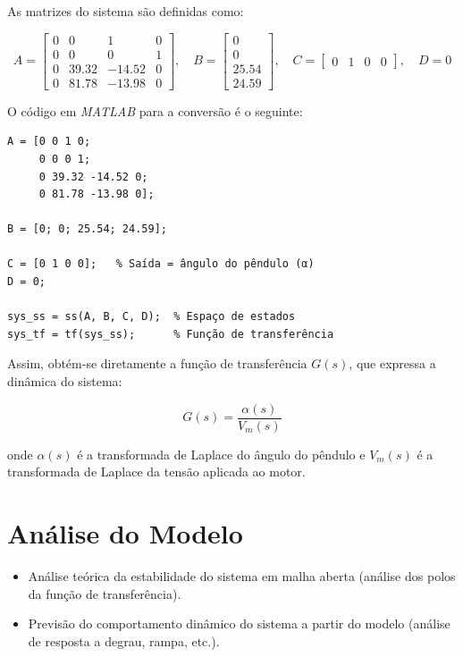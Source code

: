 \documentclass[9pt,a4paper,twocolumn,twoside]{tau-class/tau}
\begin{document}
As matrizes do sistema são definidas como:

\begin{equation}
A =
\begin{bmatrix}
0 & 0 & 1 & 0 \\
0 & 0 & 0 & 1 \\
0 & 39.32 & -14.52 & 0 \\
0 & 81.78 & -13.98 & 0
\end{bmatrix}, \quad
B =
\begin{bmatrix}
0 \\ 0 \\ 25.54 \\ 24.59
\end{bmatrix}, \quad
C =
\begin{bmatrix}
0 & 1 & 0 & 0
\end{bmatrix}, \quad
D = 0
\end{equation}

O código em \textit{MATLAB} para a conversão é o seguinte:

\begin{verbatim}
A = [0 0 1 0;
     0 0 0 1;
     0 39.32 -14.52 0;
     0 81.78 -13.98 0];

B = [0; 0; 25.54; 24.59];

C = [0 1 0 0];   % Saída = ângulo do pêndulo (α)
D = 0;

sys_ss = ss(A, B, C, D);  % Espaço de estados
sys_tf = tf(sys_ss);      % Função de transferência
\end{verbatim}

Assim, obtém-se diretamente a função de transferência $G(s)$, que expressa a 
dinâmica do sistema:

\begin{equation}
    G(s) = \frac{\alpha(s)}{V_m(s)}
\end{equation}

onde $\alpha(s)$ é a transformada de Laplace do ângulo do pêndulo e $V_m(s)$ é a 
transformada de Laplace da tensão aplicada ao motor.



\section{Análise do Modelo}
\begin{itemize}
    \item Análise teórica da estabilidade do sistema em malha aberta (análise dos polos da função de transferência).
    \item Previsão do comportamento dinâmico do sistema a partir do modelo (análise de resposta a degrau, rampa, etc.).
\end{itemize}
\end{document}
